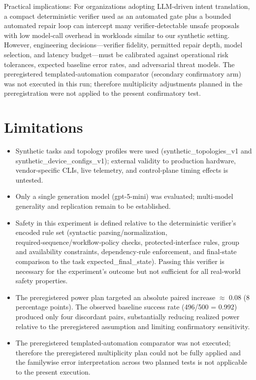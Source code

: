 \documentclass[conference]{IEEEtran}
\begin{document}
Practical implications: For organizations adopting LLM‑driven intent translation, a compact deterministic verifier used as an automated gate plus a bounded automated repair loop can intercept many verifier‑detectable unsafe proposals with low model‑call overhead in workloads similar to our synthetic setting. However, engineering decisions---verifier fidelity, permitted repair depth, model selection, and latency budget---must be calibrated against operational risk tolerances, expected baseline error rates, and adversarial threat models. The preregistered templated‑automation comparator (secondary confirmatory arm) was not executed in this run; therefore multiplicity adjustments planned in the preregistration were not applied to the present confirmatory test.

\section{Limitations}
\begin{itemize}
\item Synthetic tasks and topology profiles were used (synthetic\_topologies\_v1 and synthetic\_device\_configs\_v1); external validity to production hardware, vendor‑specific CLIs, live telemetry, and control‑plane timing effects is untested.
\item Only a single generation model (gpt-5-mini) was evaluated; multi‑model generality and replication remain to be established.
\item Safety in this experiment is defined relative to the deterministic verifier's encoded rule set (syntactic parsing/normalization, required‑sequence/workflow‑policy checks, protected‑interface rules, group and availability constraints, dependency‑rule enforcement, and final‑state comparison to the task expected\_final\_state). Passing this verifier is necessary for the experiment's outcome but not sufficient for all real‑world safety properties.
\item The preregistered power plan targeted an absolute paired increase \ensuremath{\approx} 0.08 (8 percentage points). The observed baseline success rate (496/500 = 0.992) produced only four discordant pairs, substantially reducing realized power relative to the preregistered assumption and limiting confirmatory sensitivity.
\item The preregistered templated‑automation comparator was not executed; therefore the preregistered multiplicity plan could not be fully applied and the familywise error interpretation across two planned tests is not applicable to the present execution.
\end{itemize}
\end{document}
